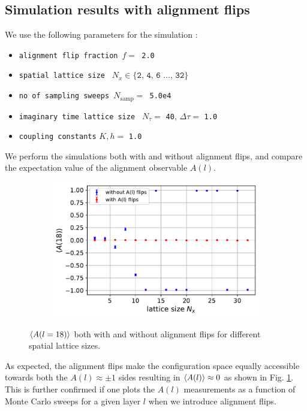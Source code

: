 \documentclass[../journal_main.tex]{subfiles}
\begin{document}
\subsection{Simulation results with alignment flips}
We use the following parameters for the simulation :
\begin{itemize}[label={}]
    \setlength{\itemsep}{0.1em}
    \item \texttt{alignment flip fraction $f = $ 2.0}
    \item \texttt{spatial lattice size } $N_x \in \{ \texttt{2, 4, 6 $\ldots$, 32} \}$  
    \item \texttt{no of sampling sweeps $N_\text{samp} = $ 5.0e4} 
    \item \texttt{imaginary time lattice size } $N_\tau = $ \texttt{40}, \: $\Delta \tau = $ \texttt{1.0}
    \item \texttt{coupling constants} $K, h = $ \texttt{1.0} 
\end{itemize}
We perform the simulations both with and without alignment flips, and compare the expectation value of the alignment observable $A(l)$. 
\begin{figure}[!htb]
    \centering
    \begin{subfigure}[b]{0.57\textwidth}
        \centering
        \includegraphics[width=\textwidth]{images/fix_subsystem_symmetry/expval(A(l)) vs N_x (l=18) with and without aflips.pdf}
    \end{subfigure}
    \caption{$\expval{A(l = 18)}$ both with and without alignment flips for different spatial lattice sizes.}
    \label{alignflipexpval}
\end{figure}
\FloatBarrier
As expected, the alignment flips make the configuration space equally accessible towards both the $A(l)\approx \pm 1$ sides resulting in $\expval{A(l)} \approx 0$ as shown in Fig. \ref{alignflipexpval}. This is further confirmed if one plots the $A(l)$ measurements as a function of Monte Carlo sweeps for a given layer $l$ when we introduce alignment flips.  
 
\end{document}
